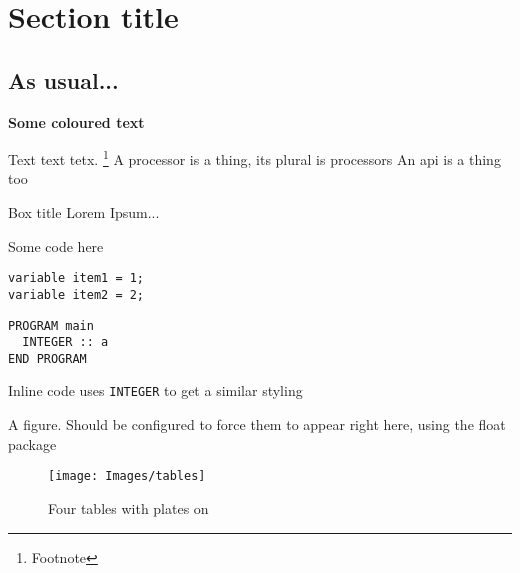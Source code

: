 \section{Section title}

\subsection{As usual...}

\textcolor{warwickgold}{\textbf{Some coloured text}}

 
Text text tetx. \footnote{Footnote}
A \gls{processor} is a thing, its plural is \glspl{processor} An \gls{api} is a thing too

\begin{asidebox}{Box title}
Lorem Ipsum...
\end{asidebox}

Some code here
\begin{lstlisting}[style=pseudostyle]
variable item1 = 1;
variable item2 = 2;

\end{lstlisting}

\begin{lstlisting}[style=forstyle]
PROGRAM main
  INTEGER :: a
END PROGRAM
\end{lstlisting}

Inline code uses \lstinline{INTEGER} to get a similar styling

A figure. Should be configured to force them to appear right here, using the float package
\begin{figure}[h]
\center
\texttt{[image: Images/tables]}
\caption{Four tables with plates on}\label{fig:tables}
\end{figure}



